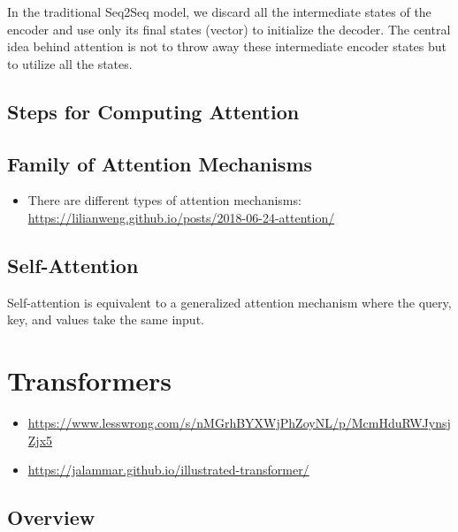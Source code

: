 \documentclass[
]{book}
\providecommand{\tightlist}{%
  \setlength{\itemsep}{0pt}\setlength{\parskip}{0pt}}
\begin{document}
In the traditional Seq2Seq model, we discard all the intermediate states of the encoder and use only its final states (vector) to initialize the decoder. The central idea behind attention is not to throw away these intermediate encoder states but to utilize all the states.

\hypertarget{steps-for-computing-attention}{%
\subsection{Steps for Computing Attention}\label{steps-for-computing-attention}}

\hypertarget{family-of-attention-mechanisms}{%
\subsection{Family of Attention Mechanisms}\label{family-of-attention-mechanisms}}

\begin{itemize}
\tightlist
\item
  There are different types of attention mechanisms: \url{https://lilianweng.github.io/posts/2018-06-24-attention/}
\end{itemize}

\hypertarget{self-attention}{%
\subsection{Self-Attention}\label{self-attention}}

Self-attention is equivalent to a generalized attention mechanism where the query, key, and values take the same input.

\hypertarget{transformers}{%
\section{Transformers}\label{transformers}}

\begin{itemize}
\tightlist
\item
  \url{https://www.lesswrong.com/s/nMGrhBYXWjPhZoyNL/p/McmHduRWJynsjZjx5}
\item
  \url{https://jalammar.github.io/illustrated-transformer/}
\end{itemize}

\hypertarget{overview-1}{%
\subsection{Overview}\label{overview-1}}
\end{document}
